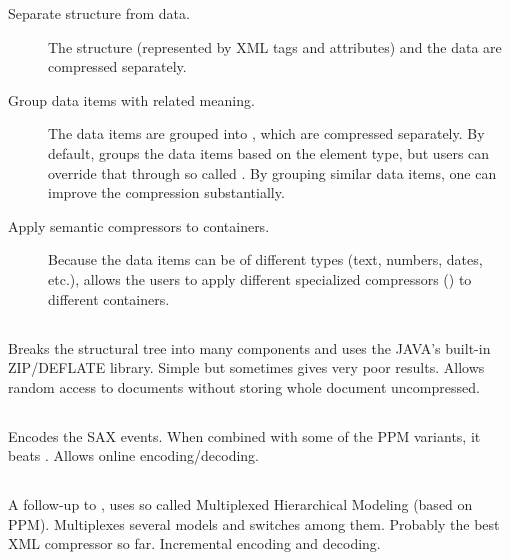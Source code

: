 \begin{description}
\item [Separate structure from data.] The structure (represented by XML tags and attributes) and the data are compressed separately.
\item [Group data items with related meaning.] The data items are grouped into , which are compressed separately. By default,  groups the data items based on the element type, but users can override that through so called . By grouping similar data items, one can improve the compression substantially.
\item [Apply semantic compressors to containers.] Because the data items can be of different types (text, numbers, dates, etc.),  allows the users to apply different specialized compressors () to different containers.
\end{description}

\subsection{}
Breaks the structural tree into many components and uses the JAVA's built-in ZIP/DEFLATE library. Simple but sometimes gives very poor results. Allows random access to documents without storing whole document uncompressed.

\subsection{}
Encodes the SAX events. When combined with some of the PPM variants, it beats . Allows online encoding/decoding.

\subsection{}
A follow-up to , uses so called Multiplexed Hierarchical Modeling (based on PPM). Multiplexes several models and switches among them. Probably the best XML compressor so far. Incremental encoding and decoding.

